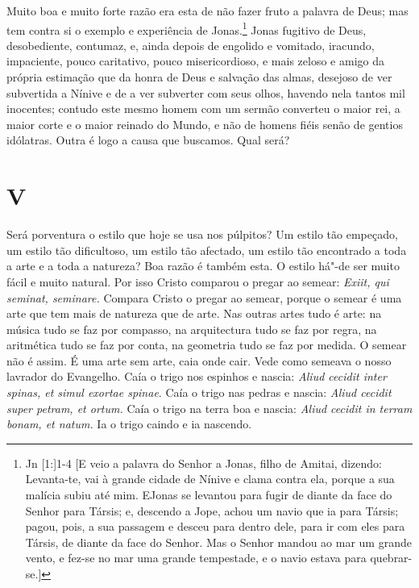 Muito boa e muito forte razão era esta de não fazer fruto a
palavra de Deus; mas tem contra si o exemplo e experiência de
Jonas.\footnote{Jn [1:]1-4 [E veio a palavra do Senhor a Jonas, filho de Amitai, dizendo: Levanta-te, vai à grande cidade de Nínive e clama contra ela, porque a sua malícia subiu até mim. EJonas se levantou para fugir de diante da face do Senhor para Társis; e, descendo a Jope, achou um navio que ia para Társis; pagou, pois, a sua passagem e desceu para dentro dele, para ir com eles para Társis, de diante da face do Senhor. Mas o Senhor mandou ao mar um grande vento, e fez-se no mar uma grande tempestade, e o navio estava para quebrar-se.]} Jonas fugitivo de Deus, desobediente, contumaz, e, ainda depois
de engolido e vomitado, iracundo, impaciente, pouco caritativo, pouco
misericordioso, e mais zeloso e amigo da própria estimação que da honra
de Deus e salvação das almas, desejoso de ver subvertida a Nínive e de a
ver subverter com seus olhos, havendo nela tantos mil inocentes; contudo
este mesmo homem com um sermão converteu o maior rei, a maior corte e o
maior reinado do Mundo, e não de homens fiéis senão de gentios idólatras. Outra é logo a causa que buscamos. Qual será?

\section*{V}

Será porventura o estilo que hoje se usa nos púlpitos? Um estilo tão
empeçado, um estilo tão dificultoso, um estilo tão afectado, um estilo
tão encontrado a toda a arte e a toda a natureza? Boa razão é também
esta. O estilo há"-de ser muito fácil e muito natural. Por isso Cristo
comparou o pregar ao semear: \emph{Exiit, qui seminat, seminare.}
Compara Cristo o pregar ao semear, porque o semear é uma arte que tem
mais de natureza que de arte. Nas outras artes tudo é arte: na música
tudo se faz por compasso, na arquitectura tudo se faz por regra, na
aritmética tudo se faz por conta, na geometria tudo se faz por medida.
O semear não é assim. É uma arte sem arte, caia onde cair. Vede como
semeava o nosso lavrador do Evangelho. Caía o trigo nos espinhos e
nascia: \emph{Aliud cecidit inter spinas, et simul exortae spinae}.
Caía o trigo nas pedras e nascia: \emph{Aliud cecidit super petram,
et ortum.} Caía o trigo na terra boa e nascia: \emph{Aliud cecidit
in terram bonam, et natum.} Ia o trigo caindo e ia nascendo.

